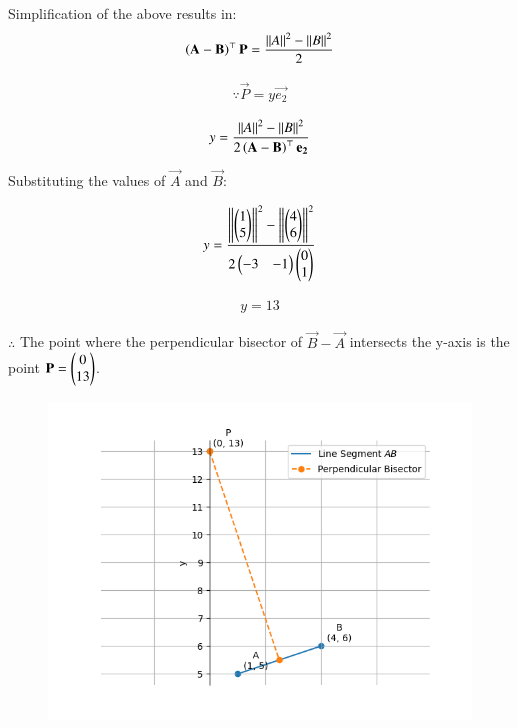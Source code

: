\documentclass[journal]{IEEEtran}
\begin{document}
Simplification of the above results in:
\begin{align}
    \left(\mathbf{A}-\mathbf{B}\right)^\top\mathbf{P} = \frac{\left\lVert A\right\rVert^2 - \left\lVert B\right\rVert^2}{2} 
\end{align}

\begin{align}
    \because \vec{P} = y\vec{e_2}   
\end{align}

\begin{align}
    y = \frac{\left\lVert A\right\rVert^2-\left\lVert B\right\rVert^2}{2\left(\mathbf{A}-\mathbf{B}\right)^\top\mathbf{e_2}}
\end{align}

Substituting the values of $\vec{A}$ and $\vec{B}$:

\begin{align}
    y = \frac{\left\lVert\begin{pmatrix}1\\5\end{pmatrix}\right\rVert^2 - \left\lVert\begin{pmatrix}4\\6\end{pmatrix}\right\rVert^2}{2\begin{pmatrix}-3 & -1\end{pmatrix}\begin{pmatrix}0\\1\end{pmatrix}}
\end{align}

\begin{align}
    y = 13
\end{align}

$\therefore$ The point where the perpendicular bisector of $\vec{B}-\vec{A}$ intersects the y-axis is the point $\mathbf{P}=\begin{pmatrix}0\\13\end{pmatrix}$.

\begin{figure}[H]
    \centering
    \includegraphics[width=1\linewidth]{Figs/plot(py+C).png}
\end{figure}
\end{document}
